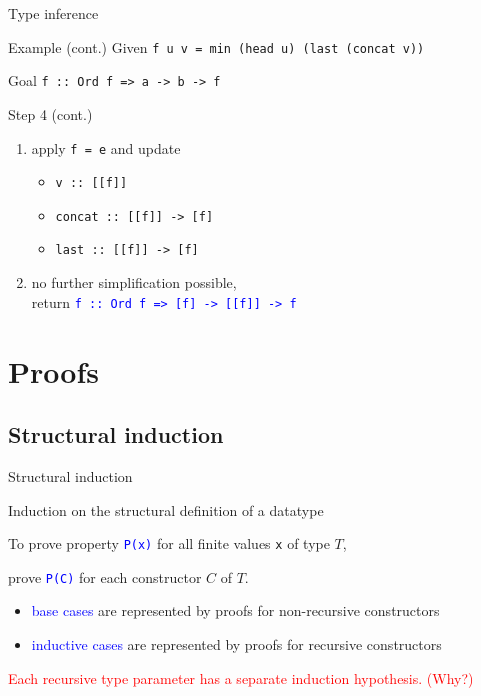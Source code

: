 \documentclass{beamer}
\def\code#1{\texttt{\frenchspacing#1}}
\begin{document}
\begin{frame}{Type inference}

\begin{exampleblock}{Example (cont.)}
Given \code{f u v = min (head u) (last (concat v))} \par
Goal \code{f :: Ord f => a -> b -> f}

\vspace{0.25cm}
Step 4 (cont.)\pause
\begin{enumerate}
    \item apply \code{f = e} and update\pause
        \begin{itemize}
            \item \code{v :: [[f]]}\pause
            \item \code{concat :: [[f]] -> [f]}\pause
            \item \code{last :: [[f]] -> [f]}\pause
        \end{itemize}
    \item no further simplification possible, \\ return \textcolor{blue}{\code{f :: Ord f => [f] -> [[f]] -> f}}
\end{enumerate}
\end{exampleblock}

\end{frame}

\section{Proofs}

\subsection{Structural induction}

\begin{frame}{Structural induction}

\begin{block}{\centering Induction on the structural definition of a datatype}
\end{block}

\pause

To prove property \textcolor{blue}{\code{P(x)}} for all finite values \code{x} of type $T$, \par
prove \textcolor{blue}{\code{P(C)}} for each constructor $C$ of $T$.

\pause

\vspace{0.5cm}
\begin{itemize}
    \item \textcolor{blue}{base cases} are represented by proofs for non-recursive constructors\pause
    \item \textcolor{blue}{inductive cases} are represented by proofs for recursive constructors
\end{itemize}

\pause

\vspace{0.5cm}
\textcolor{red}{Each recursive type parameter has a separate induction hypothesis. (Why?)}

\end{frame}
\end{document}
